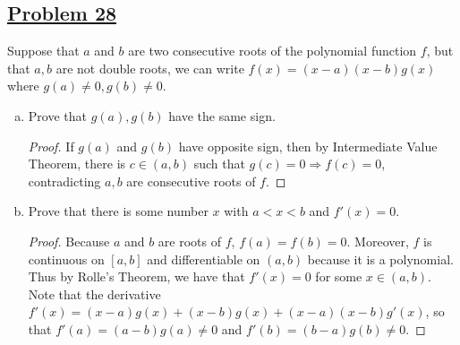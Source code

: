\documentclass[10pt,letterpaper]{article}
\begin{document}
	\subsection*{{\color{purple}\underline{Problem 28}}}
	Suppose that $a$ and $b$ are two consecutive roots of the polynomial function $f$, but that
	$a, b$ are not double roots, we can write $f(x) = (x - a)(x - b)g(x)$ where $g(a) \neq 0, g(b) \neq 0$.
	\begin{enumerate}[(a)]
		\item Prove that $g(a), g(b)$ have the same sign.
		\begin{proof}
		If $g(a)$ and $g(b)$ have opposite sign, then by Intermediate Value Theorem, there is $c \in (a, b)$
		such that $g(c) = 0 \Rightarrow f(c) = 0$, contradicting $a, b$ are consecutive roots of $f$.	
		\end{proof}				
		\item Prove that there is some number $x$ with $a < x < b$ and $f'(x) = 0$.
		\begin{proof}
			Because $a$ and $b$ are roots of $f$, $f(a) = f(b) = 0$. Moreover, $f$ is continuous on $[a, b]$
			and differentiable on $(a, b)$ because it is a polynomial. Thus by Rolle's Theorem, we have 
			that $f'(x) = 0$ for some $x \in (a,b)$. Note that the derivative $f'(x) = (x - a)g(x) +
			(x - b)g(x) + (x - a)(x - b)g'(x)$, so that $f'(a) = (a - b)g(a) \neq 0$ and $f'(b) = (b - a)g(b) \neq 0$.
		\end{proof}
	\end{enumerate}
	
\end{document}
